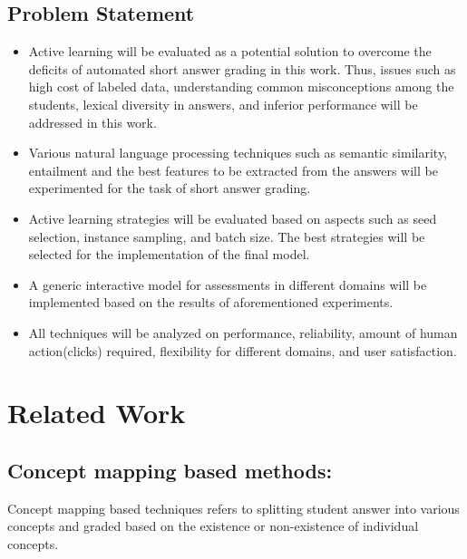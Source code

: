 \documentclass[rnd]{mas_proposal}
\begin{document}
\section{Problem Statement}
\begin{itemize}   {\tiny }
\vspace*{1\baselineskip}
    \item Active learning will be evaluated as a potential solution to overcome the deficits of automated short answer grading in this work. Thus, issues such as high cost of labeled data, understanding common misconceptions among the students, lexical diversity in answers, and inferior performance will be addressed in this work.   
    \item Various natural language processing techniques such as semantic similarity, entailment and the best features to be extracted from the answers will be experimented for the task of short answer grading. 
    \item Active learning strategies will be evaluated based on aspects such as seed selection, instance sampling, and batch size. The best strategies will be selected for the implementation of the final model.
    \item A generic interactive model for assessments in different domains will be implemented based on the results of aforementioned experiments.
    \item All techniques will be analyzed on performance, reliability, amount of human action(clicks) required, flexibility for different domains, and user satisfaction.  
\end{itemize}


\chapter{Related Work}

\section{Concept mapping based methods:}
	Concept mapping based techniques refers to splitting student answer into various concepts and graded based on the existence or non-existence of individual concepts\cite{Burrows2015}.
	
\end{document}
